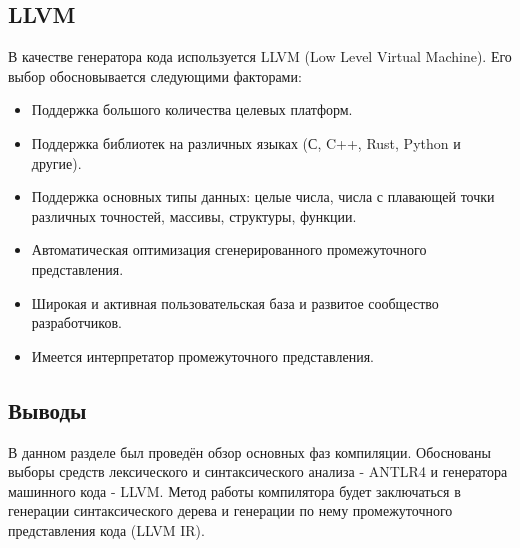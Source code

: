 \subsection{LLVM}
В качестве генератора кода используется LLVM (Low Level Virtual Machine). Его выбор обосновывается следующими факторами:

\begin{itemize}
    \item Поддержка большого количества целевых платформ.
    \item Поддержка библиотек на различных языках (С, C++, Rust, Python и другие).
    \item Поддержка основных типы данных: целые числа, числа с плавающей точки различных точностей, массивы, структуры, функции.
    \item Автоматическая оптимизация сгенерированного промежуточного представления.
    \item Широкая и активная пользовательская база и развитое сообщество разработчиков.
    \item Имеется интерпретатор промежуточного представления.
\end{itemize}

\subsection*{Выводы}
В данном разделе был проведён обзор основных фаз компиляции. Обоснованы выборы средств лексического и синтаксического анализа - ANTLR4 и генератора машинного кода - LLVM. Метод работы компилятора будет заключаться в генерации синтаксического дерева и генерации по нему промежуточного представления кода (LLVM IR).
